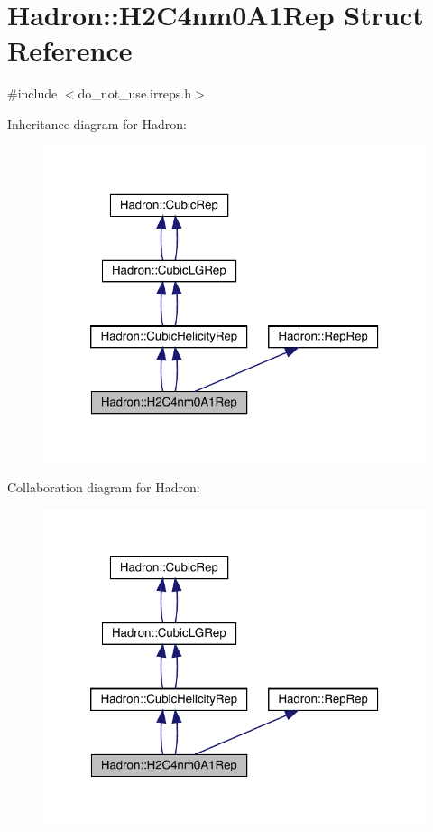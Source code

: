 \hypertarget{structHadron_1_1H2C4nm0A1Rep}{}\section{Hadron\+:\+:H2\+C4nm0\+A1\+Rep Struct Reference}
\label{structHadron_1_1H2C4nm0A1Rep}


{\ttfamily \#include $<$do\+\_\+not\+\_\+use.\+irreps.\+h$>$}



Inheritance diagram for Hadron\+:\nopagebreak
\begin{figure}[H]
\begin{center}
\leavevmode
\includegraphics[width=320pt]{d9/dc6/structHadron_1_1H2C4nm0A1Rep__inherit__graph}
\end{center}
\end{figure}


Collaboration diagram for Hadron\+:\nopagebreak
\begin{figure}[H]
\begin{center}
\leavevmode
\includegraphics[width=320pt]{d7/d42/structHadron_1_1H2C4nm0A1Rep__coll__graph}
\end{center}
\end{figure}
